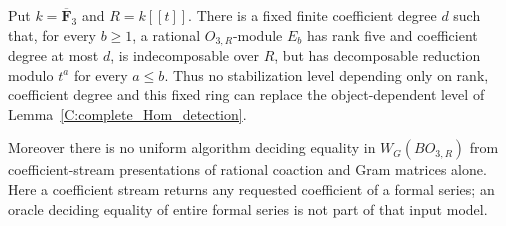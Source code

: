 \begin{proposition}
\label{C:complete_unbounded_detection}
Put $k=\overline{\mathbf F}_3$ and $R=k[[t]]$.
There is a fixed finite coefficient degree $d$ such that, for
every $b\geq1$, a rational $O_{3,R}$-module $E_b$ has rank five
and coefficient degree at most $d$, is indecomposable over $R$,
but has decomposable reduction modulo $t^a$ for every $a\leq b$.
Thus no stabilization level depending only on rank, coefficient
degree and this fixed ring can replace the object-dependent
level of Lemma~\ref{C:complete_Hom_detection}.

Moreover there is no uniform algorithm deciding equality in
$W_G(BO_{3,R})$ from coefficient-stream presentations of
rational coaction and Gram matrices alone.  Here a coefficient
stream returns any requested coefficient of a formal series;
an oracle deciding equality of entire formal series is not
part of that input model.
\end{proposition}
